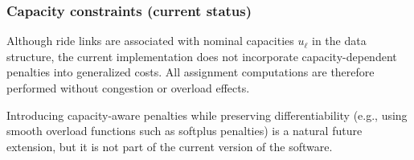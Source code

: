 \subsubsection{Capacity constraints (current status)}

Although ride links are associated with nominal capacities $u_\ell$ in the data structure, the current
implementation does not incorporate capacity-dependent penalties into generalized costs. All assignment computations
are therefore performed without congestion or overload effects.

Introducing capacity-aware penalties while preserving differentiability (e.g., using smooth overload functions such
as softplus penalties) is a natural future extension, but it is not part of the current version of the software.

